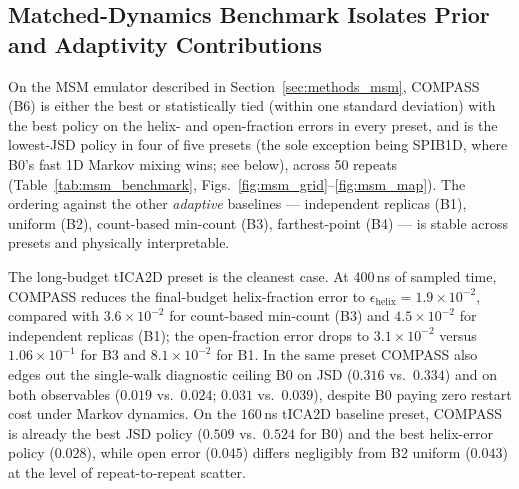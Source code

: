 \documentclass[journal=jctcce,manuscript=article,layout=twocolumn]{achemso}
\begin{document}
\subsection{Matched-Dynamics Benchmark Isolates Prior and Adaptivity Contributions}
\label{sec:results_msm}

On the MSM emulator described in Section~\ref{sec:methods_msm}, COMPASS (B6) is either the best or statistically tied (within one standard deviation) with the best policy on the helix- and open-fraction errors in every preset, and is the lowest-JSD policy in four of five presets (the sole exception being SPIB1D, where B0's fast 1D Markov mixing wins; see below), across 50 repeats (Table~\ref{tab:msm_benchmark}, Figs.~\ref{fig:msm_grid}--\ref{fig:msm_map}). The ordering against the other \emph{adaptive} baselines --- independent replicas (B1), uniform (B2), count-based min-count (B3), farthest-point (B4) --- is stable across presets and physically interpretable.

The long-budget tICA2D preset is the cleanest case. At 400\,ns of sampled time, COMPASS reduces the final-budget helix-fraction error to $\epsilon_{\mathrm{helix}}=1.9\times10^{-2}$, compared with $3.6\times10^{-2}$ for count-based min-count (B3) and $4.5\times10^{-2}$ for independent replicas (B1); the open-fraction error drops to $3.1\times10^{-2}$ versus $1.06\times10^{-1}$ for B3 and $8.1\times10^{-2}$ for B1. In the same preset COMPASS also edges out the single-walk diagnostic ceiling B0 on JSD ($0.316$ vs.\ $0.334$) and on both observables ($0.019$ vs.\ $0.024$; $0.031$ vs.\ $0.039$), despite B0 paying zero restart cost under Markov dynamics. On the $160$\,ns tICA2D baseline preset, COMPASS is already the best JSD policy ($0.509$ vs.\ $0.524$ for B0) and the best helix-error policy ($0.028$), while open error ($0.045$) differs negligibly from B2 uniform ($0.043$) at the level of repeat-to-repeat scatter.
\end{document}
